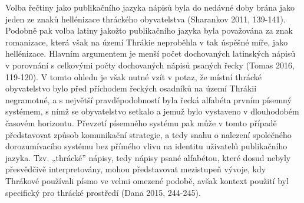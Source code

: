 Volba řečtiny jako publikačního jazyka nápisů byla do nedávné doby brána jako jeden ze znaků hellénizace thráckého obyvatelstva (Sharankov 2011, 139-141). Podobně pak volba latiny jakožto publikačního jazyka byla považována za znak romanizace, která však na území Thrákie neproběhla v tak úspěšné míře, jako hellénizace. Hlavním argumentem je menší počet dochovaných latinských nápisů v porovnání s celkovými počty dochovaných nápisů psaných řecky (Tomas 2016, 119-120). V tomto ohledu je však nutné vzít v potaz, že místní thrácké obyvatelstvo bylo před příchodem řeckých osadníků na území Thrákii negramotné, a s největší pravděpodobností byla řecká alfabéta prvním písemný systémem, s nímž se obyvatelstvo setkalo a jemuž bylo vystaveno v dlouhodobém časovém horizontu. Převzetí písemného systému pak může v tomto případě představovat způsob komunikační strategie, a tedy snahu o nalezení společného dorozumívacího systému bez přímého vlivu na identitu uživatelů publikačního jazyka. Tzv. „thrácké” nápisy, tedy nápisy psané alfabétou, které dosud nebyly přesvědčivě interpretovány, mohou představovat mezistupeň vývoje, kdy Thrákové používali písmo ve velmi omezené podobě, avšak kontext použití byl specifický pro thrácké prostředí (Dana 2015, 244-245).

